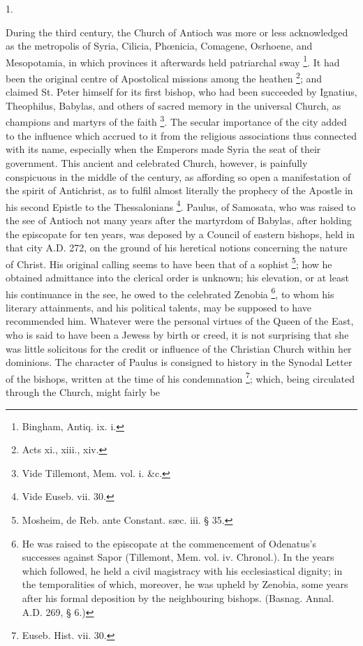 1.

During the third century, the Church of Antioch was more or less
acknowledged as the metropolis of Syria, Cilicia, Phœnicia, Comagene,
Osrhoene, and Mesopotamia, in which provinces it afterwards held
patriarchal sway \footnote{Bingham, Antiq. ix. i.}. It had
been the original centre of Apostolical missions among the heathen \footnote{Acts xi., xiii., xiv.}; and claimed St. Peter himself for its first bishop, who had
been succeeded by Ignatius, Theophilus, Babylas, and others of sacred
memory in the universal Church, as champions and martyrs of the faith
\footnote{Vide Tillemont, Mem. vol. i. \&c.}. The secular importance
of the city added to the influence which accrued to it from the
religious associations thus connected with its name, especially when
the Emperors made Syria the seat of their government. This ancient and
celebrated Church, however, is painfully conspicuous in the middle of
the century, as affording so open a manifestation of the spirit of
Antichrist, as to fulfil almost literally the prophecy of the Apostle
in his second Epistle to the Thessalonians \footnote{Vide Euseb. vii. 30.}. Paulus, of Samosata, who was raised to the see of Antioch not
many years after the martyrdom of Babylas, after holding the
episcopate for ten years, was deposed by a Council of eastern bishops,
held in that city A.D. 272, on the ground of his
heretical notions concerning the nature of Christ. His original
calling seems to have been that of a sophist \footnote{Mosheim, de Reb. ante Constant. sæc. iii.
§ 35.}; how he obtained admittance into the clerical order is
unknown; his elevation, or at least his continuance in the see, he
owed to the celebrated Zenobia \footnote{He was raised to the episcopate at the
commencement of Odenatus's successes against Sapor (Tillemont, Mem.
vol. iv. Chronol.). In the years which followed, he held a civil
magistracy with his ecclesiastical dignity; in the temporalities of
which, moreover, he was upheld by Zenobia, some years after his formal
deposition by the neighbouring bishops. (Basnag. Annal. A.D.
269, § 6.)},
to whom his literary attainments, and his political talents, may be
supposed to have recommended him. Whatever were the personal virtues
of the Queen of the East, who is said to have been a Jewess by birth
or creed, it is not surprising that she was little solicitous for the
credit or influence of the Christian Church within her dominions. The
character of Paulus is consigned to history in the Synodal Letter of
the bishops, written at the time of his condemnation \footnote{Euseb. Hist. vii. 30.}; which, being circulated through the Church, might fairly be
